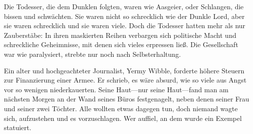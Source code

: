Die Todesser, die dem Dunklen folgten, waren wie Aasgeier, oder Schlangen, die bissen und schwächten. Sie waren nicht so schrecklich wie der Dunkle Lord, aber sie waren schrecklich und sie waren viele. Doch die Todesser hatten mehr als nur Zauberstäbe: In ihren maskierten Reihen verbargen sich politische Macht und schreckliche Geheimnisse, mit denen sich vieles erpressen ließ. Die Gesellschaft war wie paralysiert, strebte nur noch nach Selbsterhaltung.

Ein alter und hochgeachteter Journalist, Yermy Wibble, forderte höhere Steuern zur Finanzierung einer Armee. Er schrieb, es wäre absurd, wie so viele aus Angst vor so wenigen niederkauerten. Seine Haut—nur seine Haut—fand man am nächsten Morgen an der Wand seines Büros festgenagelt, neben denen seiner Frau und seiner zwei Töchter. Alle wollten etwas dagegen tun, doch niemand wagte sich, aufzustehen und es vorzuschlagen. Wer auffiel, an dem wurde ein Exempel statuiert.

